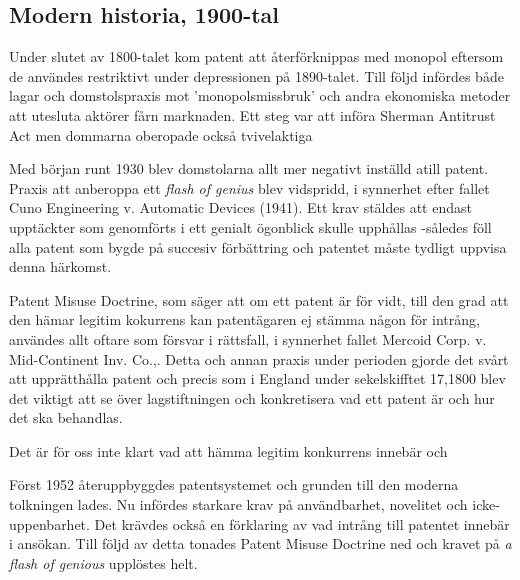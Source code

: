 
\subsection{Modern historia, 1900-tal} %

Under slutet av 1800-talet kom patent att återförknippas med monopol eftersom de användes
restriktivt under depressionen  på 1890-talet. Till följd infördes både lagar och domstolspraxis mot 'monopolsmissbruk' och andra ekonomiska metoder att utesluta aktörer fårn marknaden. Ett steg var att införa Sherman Antitrust Act men dommarna oberopade också tvivelaktiga

 Med början runt 1930 blev domstolarna allt mer negativt inställd atill
patent. Praxis att anberoppa ett \emph{flash of genius} blev vidspridd, i synnerhet efter fallet Cuno
Engineering v. Automatic Devices (1941). Ett krav stäldes att endast upptäckter som genomförts i ett
genialt ögonblick skulle upphållas -således föll alla patent som bygde på succesiv förbättring och
patentet måste tydligt uppvisa denna härkomst\cite{nard}. 

Patent Misuse Doctrine, som säger att om ett patent är för vidt, till den grad att den hämar legitim
kokurrens kan patentägaren ej stämma någon för intrång, användes allt oftare som försvar i rättsfall, i
synnerhet fallet Mercoid Corp. v. Mid-Continent Inv. Co.,\cite{nard}. Detta och annan praxis under
perioden gjorde det svårt att upprätthålla patent och precis som i England under sekelskifftet 17,1800
blev det viktigt att se över lagstiftningen och konkretisera vad ett patent är och hur det ska behandlas.

Det är för oss inte klart vad att hämma legitim konkurrens innebär och 

Först 1952 återuppbyggdes patentsystemet och grunden till den moderna tolkningen lades. Nu infördes
starkare krav på användbarhet, novelitet och icke-uppenbarhet. Det krävdes också en förklaring av vad
intrång till patentet innebär i ansökan. Till följd av detta tonades Patent Misuse Doctrine ned och
kravet på \emph{a flash of genious} upplöstes helt\cite{nard}.

